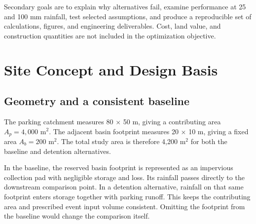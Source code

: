 \documentclass[11pt,letterpaper]{article}
\begin{document}
Secondary goals are to explain why alternatives fail, examine performance
at 25 and 100 mm rainfall, test selected assumptions, and produce a reproducible
set of calculations, figures, and engineering deliverables. Cost, land value,
and construction quantities are not included in the optimization objective.

\section{Site Concept and Design Basis}\label{sec:basis}
\subsection{Geometry and a consistent baseline}
The parking catchment measures 80 $\times$ 50 m, giving a contributing area
$A_p=4{,}000$ m$^2$. The adjacent basin footprint measures 20 $\times$ 10 m,
giving a fixed area $A_b=200$ m$^2$. The total study area is therefore
4,200 m$^2$ for both the baseline and detention alternatives.

In the baseline, the reserved basin footprint is represented as an impervious
collection pad with negligible storage and loss. Its rainfall passes directly
to the downstream comparison point. In a detention alternative, rainfall on
that same footprint enters storage together with parking runoff. This keeps
the contributing area and prescribed event input volume consistent. Omitting
the footprint from the baseline would change the comparison itself.
\end{document}
